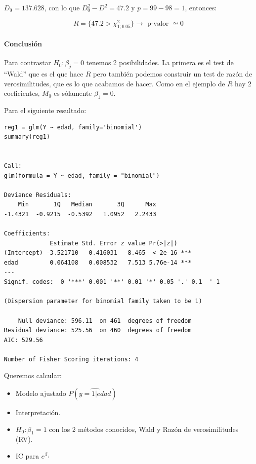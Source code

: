 $D_0 = 137.628$, con lo que $D_0^2 - D^2  = 47.2$ y $p = 99-98 = 1$, entonces:

\[
R = \{47.2 > \chi^2_{1;0.05}\}\to \text{ p-valor } \simeq 0
\]

\paragraph{Conclusión}

Para contrastar $H_0 : β_j = 0$ tenemos 2 posibilidades. La primera es el test de ``Wald'' que es el que hace $R$ pero también podemos construir un test de razón de verosimilitudes, que es lo que acabamos de hacer. Como en el ejemplo de $R$ hay 2 coeficientes, $M_0$ es sólamente $β_1 = 0$.


\begin{example}

Para el siguiente resultado:

\begin{lstlisting}[style=mystyle]
reg1 = glm(Y ~ edad, family='binomial')
summary(reg1)


Call:
glm(formula = Y ~ edad, family = "binomial")

Deviance Residuals: 
    Min       1Q   Median       3Q      Max  
-1.4321  -0.9215  -0.5392   1.0952   2.2433  

Coefficients:
             Estimate Std. Error z value Pr(>|z|)    
(Intercept) -3.521710   0.416031  -8.465  < 2e-16 ***
edad         0.064108   0.008532   7.513 5.76e-14 ***
---
Signif. codes:  0 '***' 0.001 '**' 0.01 '*' 0.05 '.' 0.1  ' 1 

(Dispersion parameter for binomial family taken to be 1)

    Null deviance: 596.11  on 461  degrees of freedom
Residual deviance: 525.56  on 460  degrees of freedom
AIC: 529.56

Number of Fisher Scoring iterations: 4
\end{lstlisting}




Queremos calcular:
\begin{itemize}
  \item Modelo ajustado $P(\hat{y=1 | edad})$
  \item Interpretación.
  \item $H_0 : β_1 = 1$ con los 2 métodos conocidos, Wald y Razón de verosimilitudes (RV).
  \item IC para $e^{β_1}$
\end{itemize}


\end{example}
